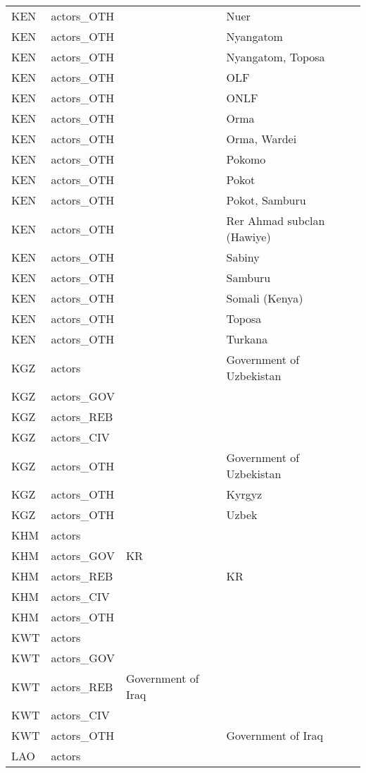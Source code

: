\begin{table}[ht]
\begin{tabular}{llll}
  KEN & actors\_OTH &  & Nuer \\ 
  KEN & actors\_OTH &  & Nyangatom \\ 
  KEN & actors\_OTH &  & Nyangatom, Toposa \\ 
  KEN & actors\_OTH &  & OLF \\ 
  KEN & actors\_OTH &  & ONLF \\ 
  KEN & actors\_OTH &  & Orma \\ 
  KEN & actors\_OTH &  & Orma, Wardei \\ 
  KEN & actors\_OTH &  & Pokomo \\ 
  KEN & actors\_OTH &  & Pokot \\ 
  KEN & actors\_OTH &  & Pokot, Samburu \\ 
  KEN & actors\_OTH &  & Rer Ahmad subclan (Hawiye) \\ 
  KEN & actors\_OTH &  & Sabiny \\ 
  KEN & actors\_OTH &  & Samburu \\ 
  KEN & actors\_OTH &  & Somali (Kenya) \\ 
  KEN & actors\_OTH &  & Toposa \\ 
  KEN & actors\_OTH &  & Turkana \\ 
  KGZ & actors &  & Government of Uzbekistan \\ 
  KGZ & actors\_GOV &  &  \\ 
  KGZ & actors\_REB &  &  \\ 
  KGZ & actors\_CIV &  &  \\ 
  KGZ & actors\_OTH &  & Government of Uzbekistan \\ 
  KGZ & actors\_OTH &  & Kyrgyz \\ 
  KGZ & actors\_OTH &  & Uzbek \\ 
  KHM & actors &  &  \\ 
  KHM & actors\_GOV & KR &  \\ 
  KHM & actors\_REB &  & KR \\ 
  KHM & actors\_CIV &  &  \\ 
  KHM & actors\_OTH &  &  \\ 
  KWT & actors &  &  \\ 
  KWT & actors\_GOV &  &  \\ 
  KWT & actors\_REB & Government of Iraq &  \\ 
  KWT & actors\_CIV &  &  \\ 
  KWT & actors\_OTH &  & Government of Iraq \\ 
  LAO & actors &  &  \\ 

\end{tabular}
\end{table}
